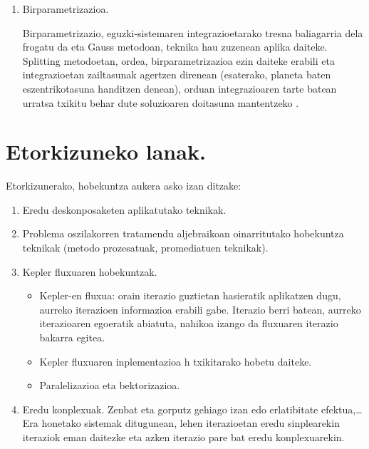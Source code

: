 \begin{enumerate}
\item Birparametrizazioa.

Birparametrizazio, eguzki-sistemaren integrazioetarako tresna baliagarria dela frogatu da \cite{Fukushima2007,Rauch1998} eta Gauss metodoan,  teknika hau zuzenean aplika daiteke. Splitting metodoetan, ordea, birparametrizazioa ezin daiteke erabili eta integrazioetan zailtasunak agertzen direnean (esaterako, planeta baten eszentrikotasuna handitzen denean), orduan integrazioaren tarte batean urratsa txikitu behar dute soluzioaren doitasuna mantentzeko \cite{Laskar2009}.

\end{enumerate}


\section*{Etorkizuneko lanak.}


Etorkizunerako, hobekuntza aukera asko izan ditzake:
\begin{enumerate}
\item Eredu deskonposaketen aplikatutako teknikak.
\item Problema oszilakorren tratamendu aljebraikoan oinarritutako hobekuntza teknikak (metodo prozesatuak, promediatuen teknikak).
\item Kepler fluxuaren hobekuntzak.
\begin{itemize}
\item Kepler-en fluxua: orain iterazio guztietan hasieratik aplikatzen dugu, aurreko iterazioen informazioa erabili gabe. Iterazio berri batean, aurreko iterazioaren egoeratik abiatuta, nahikoa izango da fluxuaren iterazio bakarra egitea.
\item Kepler fluxuaren inplementazioa h txikitarako hobetu daiteke.
\item Paralelizazioa eta bektorizazioa.
\end{itemize}

\item Eredu konplexuak.
Zenbat eta gorputz gehiago izan edo erlatibitate efektua,\dots Era honetako sistemak ditugunean, lehen iterazioetan eredu sinplearekin iteraziok eman daitezke eta azken iterazio pare bat eredu konplexuarekin. 
\end{enumerate} 









